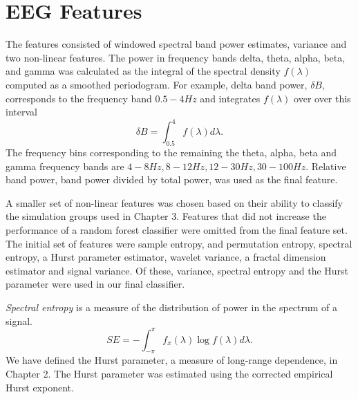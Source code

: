 \section{EEG Features}

The features consisted of windowed spectral band power
estimates, variance and two non-linear features.
The power in frequency bands 
delta, theta, alpha, beta, and gamma was calculated 
as the integral of the spectral density $f(\lambda)$ 
computed as a smoothed periodogram. For example, 
delta band power, $\delta B$, corresponds to 
the frequency band $0.5-4Hz$ and integrates  
$f(\lambda)$ over over this interval
\[
  \delta B = \int_{0.5}^{4} f(\lambda) d\lambda. 
\]
The frequency bins corresponding to the remaining
the theta, alpha, beta and gamma frequency bands are 
$ 4-8Hz, 8-12Hz, 12-30Hz, 30-100Hz$. Relative 
band power, band power divided by total power, 
was used as the final feature.

A smaller set of non-linear features was chosen 
based on their ability to 
classify the simulation groups used in Chapter 3. 
Features that did not increase the performance of a random 
forest classifier were omitted from the final feature set.
The initial set of features were sample entropy,
and permutation entropy, spectral entropy, a Hurst 
parameter estimator, wavelet variance, a fractal dimension estimator and signal variance. Of these, variance, spectral entropy and the Hurst parameter were used in our final classifier.



 \textit{Spectral entropy} is a measure of the distribution of 
 power in the spectrum of a signal. 
\[  
  SE = - \int_{-\pi}^{\pi} f_x(\lambda) \log f(\lambda) d \lambda.
\]
We have defined the Hurst parameter, a measure of long-range 
dependence, in Chapter 2. The Hurst parameter was estimated using the corrected empirical Hurst exponent\cite{weron2002}.  


